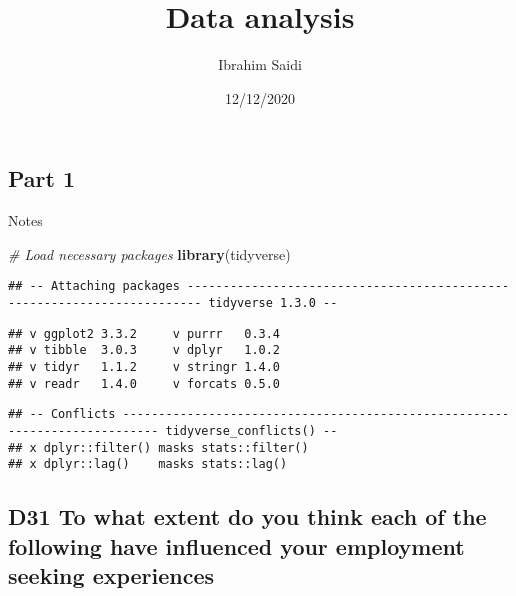 \documentclass[
]{article}
\title{Data analysis}
\author{Ibrahim Saidi}
\date{12/12/2020}
\newenvironment{Shaded}{\begin{snugshade}}{\end{snugshade}}
\newcommand{\CommentTok}[1]{\textcolor[rgb]{0.56,0.35,0.01}{\textit{#1}}}
\newcommand{\KeywordTok}[1]{\textcolor[rgb]{0.13,0.29,0.53}{\textbf{#1}}}
\newcommand{\NormalTok}[1]{#1}
\newcommand{\OperatorTok}[1]{\textcolor[rgb]{0.81,0.36,0.00}{\textbf{#1}}}
\newcommand{\StringTok}[1]{\textcolor[rgb]{0.31,0.60,0.02}{#1}}
\begin{document}
\maketitle

\hypertarget{part-1}{%
\subsection{Part 1}\label{part-1}}

Notes

\begin{Shaded}
\begin{Highlighting}[]
\CommentTok{# Load necessary packages}
\KeywordTok{library}\NormalTok{(tidyverse)}
\end{Highlighting}
\end{Shaded}

\begin{verbatim}
## -- Attaching packages ------------------------------------------------------------------------ tidyverse 1.3.0 --
\end{verbatim}

\begin{verbatim}
## v ggplot2 3.3.2     v purrr   0.3.4
## v tibble  3.0.3     v dplyr   1.0.2
## v tidyr   1.1.2     v stringr 1.4.0
## v readr   1.4.0     v forcats 0.5.0
\end{verbatim}

\begin{verbatim}
## -- Conflicts --------------------------------------------------------------------------- tidyverse_conflicts() --
## x dplyr::filter() masks stats::filter()
## x dplyr::lag()    masks stats::lag()
\end{verbatim}

\begin{Shaded}
\end{Shaded}

\hypertarget{d31-to-what-extent-do-you-think-each-of-the-following-have-influenced-your-employment-seeking-experiences}{%
\subsection{D31 To what extent do you think each of the following have
influenced your employment seeking
experiences}\label{d31-to-what-extent-do-you-think-each-of-the-following-have-influenced-your-employment-seeking-experiences}}
\end{document}
